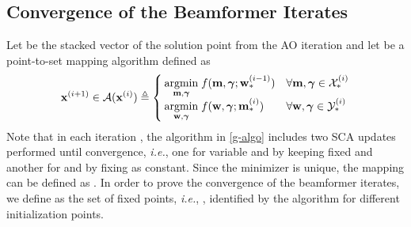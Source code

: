 \subsection{Convergence of the Beamformer Iterates} \label{c-b}
Let  be the stacked vector of the solution point from the  \ac{AO} iteration and let  be a point-to-set mapping algorithm defined as
\begin{equation} \label{g-algo}
\iterate{\ma}{i+1} \in \mc{A}(\iterate{\ma}{i}) \triangleq
\begin{cases}
\underset{\mx,\mz}{\mathrm{argmin}} \; f(\mx,\mz;\iter{\my}{\ast}{i-1})& \forall \mx,\mz \in \iter{\mc{X}}{\ast}{i} \\
\underset{\my,\mz}{\mathrm{argmin}} \; f(\my,\mz;\iter{\mx}{\ast}{i})& \forall \my,\mz \in \iter{\mc{Y}}{\ast}{i} 
\end{cases} 
\end{equation}
Note that in each iteration , the algorithm  in \eqref{g-algo} includes two \ac{SCA} updates performed until convergence, \textit{i.e.}, one for variable \me{\mx} and \me{\mz} by keeping \me{\my} fixed and another for \me{\my} and \me{\mz} by fixing \me{\mx} as constant. Since the minimizer is unique, the mapping can be defined as . In order to prove the convergence of the beamformer iterates, we define  as the set of fixed points, \textit{i.e.}, , identified by the algorithm  for different initialization points. 

